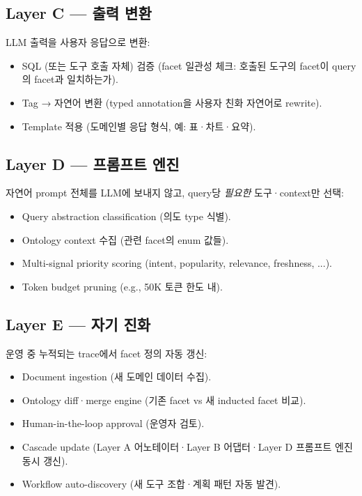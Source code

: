 \documentclass[11pt]{article}
\theoremstyle{definition}
\begin{document}
\subsection{Layer C — 출력 변환}
\label{sec:layer-c}

LLM 출력을 사용자 응답으로 변환:
\begin{itemize}[leftmargin=*]
\item SQL (또는 도구 호출 자체) 검증 (facet 일관성 체크: 호출된 도구의 facet이 query의 facet과 일치하는가).
\item Tag → 자연어 변환 (typed annotation을 사용자 친화 자연어로 rewrite).
\item Template 적용 (도메인별 응답 형식, 예: 표·차트·요약).
\end{itemize}

\subsection{Layer D — 프롬프트 엔진}
\label{sec:layer-d}

자연어 prompt 전체를 LLM에 보내지 않고, query당 \emph{필요한} 도구·context만 선택:
\begin{itemize}[leftmargin=*]
\item Query abstraction classification (의도 type 식별).
\item Ontology context 수집 (관련 facet의 enum 값들).
\item Multi-signal priority scoring (intent, popularity, relevance, freshness, ...).
\item Token budget pruning (e.g., 50K 토큰 한도 내).
\end{itemize}

\subsection{Layer E — 자기 진화}
\label{sec:layer-e}

운영 중 누적되는 trace에서 facet 정의 자동 갱신:
\begin{itemize}[leftmargin=*]
\item Document ingestion (새 도메인 데이터 수집).
\item Ontology diff·merge engine (기존 facet vs 새 inducted facet 비교).
\item Human-in-the-loop approval (운영자 검토).
\item Cascade update (Layer A 어노테이터·Layer B 어댑터·Layer D 프롬프트 엔진 동시 갱신).
\item Workflow auto-discovery (새 도구 조합·계획 패턴 자동 발견).
\end{itemize}
\end{document}
